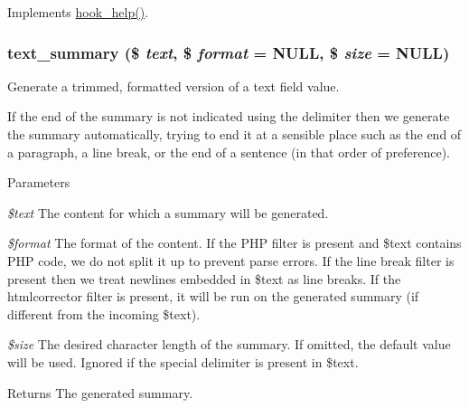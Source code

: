\label{text_8module_ada236d36b8e686509f3de37cb66a1187}
Implements \hyperlink{group__hooks_ga5589c2714a782738e8851c4c90231f0e}{hook\_\-help()}. \hypertarget{text_8module_a5ae589015a2710f032b1407af469a4c1}{
\subsubsection[{text\_\-summary}]{\setlength{\rightskip}{0pt plus 5cm}text\_\-summary (\$ {\em text}, \/  \$ {\em format} = {\ttfamily NULL}, \/  \$ {\em size} = {\ttfamily NULL})}}
\label{text_8module_a5ae589015a2710f032b1407af469a4c1}
Generate a trimmed, formatted version of a text field value.

If the end of the summary is not indicated using the delimiter then we generate the summary automatically, trying to end it at a sensible place such as the end of a paragraph, a line break, or the end of a sentence (in that order of preference).


\begin{DoxyParams}{Parameters}
\item[{\em \$text}]The content for which a summary will be generated. \item[{\em \$format}]The format of the content. If the PHP filter is present and \$text contains PHP code, we do not split it up to prevent parse errors. If the line break filter is present then we treat newlines embedded in \$text as line breaks. If the htmlcorrector filter is present, it will be run on the generated summary (if different from the incoming \$text). \item[{\em \$size}]The desired character length of the summary. If omitted, the default value will be used. Ignored if the special delimiter is present in \$text. \end{DoxyParams}
\begin{DoxyReturn}{Returns}
The generated summary. 
\end{DoxyReturn}
